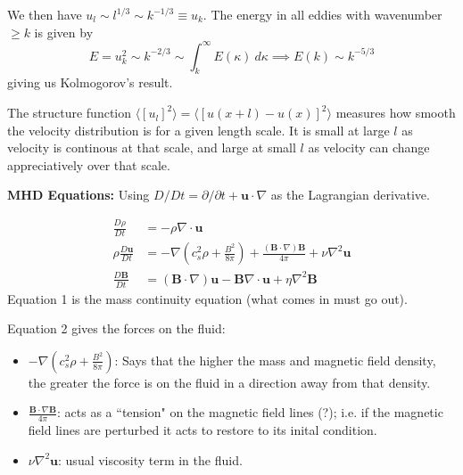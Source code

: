 \documentclass[12pt,letterpaper]{article}
\newcommand{\B}[1]{\mathbf{#1}}
\begin{document}
  We then have $u_l\sim l^{1/3}\sim k^{-1/3} \equiv u_k$. The energy in all eddies with wavenumber $\geq k$  is given by
  $$
  E = u^2_k \sim k^{-2/3} \sim \int_k^\infty E(\kappa) \ d\kappa  \implies E(k) \sim k^{-5/3}
  $$
  giving us Kolmogorov's result.

  The structure function $\langle[u_l]^2 \rangle = \langle [u(x+l)-u(x)]^2\rangle$ measures how smooth the velocity distribution is for a given length scale. It is small at large $l$ as velocity is continous at that scale, and large at small $l$ as velocity can change appreciatively over that scale.

  \textbf{MHD Equations: }
  Using $D/Dt = \partial / \partial t + \B{u}\cdot\nabla$ as the Lagrangian derivative.

  \begin{align}
        \frac{D\rho}{Dt} &= -\rho \nabla\cdot\B{u} \\
        \rho \frac{D\B{u}}{Dt} &= -\nabla\left(c_s^2\rho + \frac{B^2}{8\pi}\right) + \frac{(\B{B}\cdot\nabla)\B{B}}{4\pi} + \nu \nabla^2 \B{u} \\
        \frac{D\B{B}}{Dt} &= (\B{B}\cdot\nabla)\B{u} - \B{B}\nabla\cdot\B{u} + \eta \nabla^2\B{B}
  \end{align}
  Equation 1 is the mass continuity equation (what comes in must go out).

  Equation 2 gives the forces on the fluid:
  \begin{itemize}
    \item $-\nabla\left(c_s^2\rho + \frac{B^2}{8\pi}\right)$: Says that the higher the mass and magnetic field density, the greater the force is on the fluid in a direction away from that density.

    \item $\frac{\B{B}\cdot\nabla\B{B}}{4\pi}$: acts as a ``tension" on the magnetic field lines (?); i.e. if the magnetic field lines are perturbed it acts to restore to its inital condition.

    \item $\nu \nabla^2 \B{u}$: usual viscosity term in the fluid.
  \end{itemize}
\end{document}
